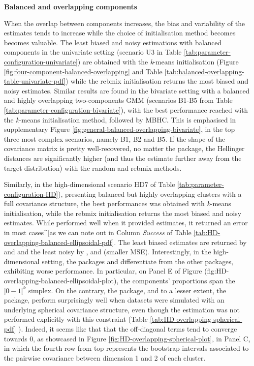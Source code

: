\textbf{Balanced and overlapping components}

When the overlap between components increases, the bias and variability of the estimates tends to increase while the choice of initialisation method becomes becomes valuable.
The least biased and noisy estimations with balanced components in the univariate setting (scenario U3 in Table
\ref{tab:parameter-configuration-univariate}) are obtained with
the \emph{k}-means initialisation (Figure
\ref{fig:four-component-balanced-overlapping} and Table
\ref{tab:balanced-overlapping-table-univariate-pdf}) while
the rebmix initialisation returns the most biased and noisy
estimates. Similar results are found in the bivariate setting with a balanced and highly overlapping two-components GMM (scenarios B1-B5 from Table \ref{tab:parameter-configuration-bivariate}), with the best performance reached with the \emph{k}-means initialisation method, followed by MBHC. This is emphasised in supplementary Figure \ref{fig:general-balanced-overlapping-bivariate}, in the top three most complex scenarios, namely B1, B2 and B5. If the shape of the covariance matrix is pretty well-recovered, no matter the package, the Hellinger distances are significantly higher (and thus the estimate further away from the target distribution) with the random and rebmix methods.

\color{blue}

Similarly, in the high-dimensional scenario HD7 of Table \ref{tab:parameter-configuration-HD}), presenting balanced but highly overlapping clusters with a full covariance structure, the best performances was obtained with \emph{k}-means initialisation, while the rebmix initialisation returns the most biased and noisy estimates. While  performed well when it provided estimates, it returned an error in most cases\^{}{[}as we can note out in Column \emph{Success} of Table \ref{tab:HD-overlapping-balanced-ellipsoidal-pdf}. The least biased estimates are returned by  and  and the least noisy by ,  and  (smaller MSE). Interestingly, in the high-dimensional setting, the packages  and  differentiate from the other packages, exhibiting worse performance. In particular, on Panel E of Figure (fig:HD-overlapping-balanced-ellipsoidal-plot), the components' proportions span the \(]0-1[^k\) simplex.
On the contrary, the  package, and to a lesser extent, the  package, perform surprisingly well when datasets were simulated with an underlying spherical covariance structure, even though the estimation was not performed explicitly with this constraint (Table \ref{tab:HD-overlapping-spherical-pdf}
). Indeed, it seems like that that the off-diagonal terms tend to converge towards 0, as showcased in Figure \ref{fig:HD-overlapping-spherical-plot}, in Panel C, in which the fourth row from top represents the bootstrap intervals associated to the pairwise covariance between dimension 1 and 2 of each cluster.\\
\color{black}

